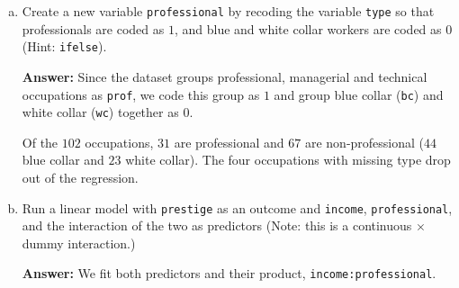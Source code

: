 \documentclass[12pt,letterpaper]{article}
\newcommand{\rcode}[2]{}
\newcommand{\answer}{\par\vspace{.18cm}\noindent\textbf{Answer:} }
\begin{document}
\begin{enumerate}[(a)]
\setlength{\itemsep}{4pt}\setlength{\parsep}{2pt}
\item Create a new variable \texttt{professional} by recoding the variable \texttt{type} so that professionals are coded as $1$, and blue and white collar workers are coded as $0$ (Hint: \texttt{ifelse}).

\answer Since the dataset groups professional, managerial and technical occupations as \texttt{prof}, we code this group as $1$ and group blue collar (\texttt{bc}) and white collar (\texttt{wc}) together as $0$.

\rcode{11}{14}
\rcode{17}{21}

\par\nobreak
{\setlength{\tabcolsep}{4pt}\renewcommand{\arraystretch}{0.93}%
\noindent{}\par}
\smallskip

Of the $102$ occupations, $31$ are professional and $67$ are non-professional ($44$ blue collar and $23$ white collar). The four occupations with missing type drop out of the regression.

\newpage

\item Run a linear model with \texttt{prestige} as an outcome and \texttt{income}, \texttt{professional}, and the interaction of the two as predictors (Note: this is a continuous $\times$ dummy interaction.)

\answer We fit both predictors and their product, \texttt{income:professional}.

\rcode{26}{28}


\end{enumerate}
\end{document}
